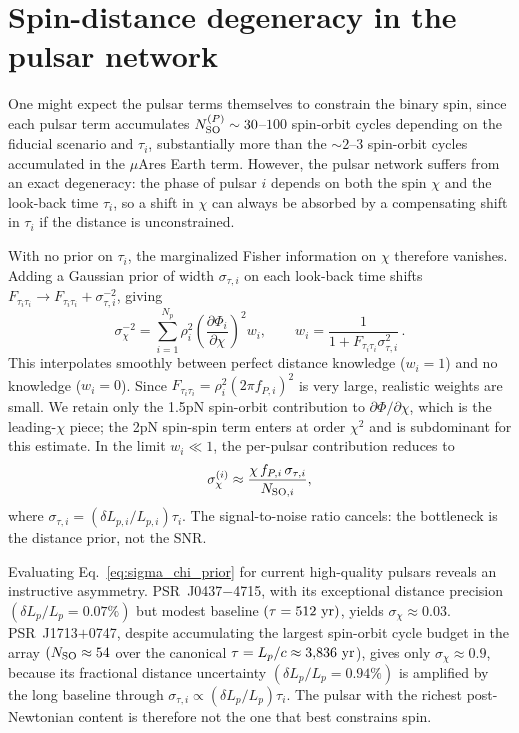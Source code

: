 \documentclass[aps,prx,twocolumn,superscriptaddress,nofootinbib,longbibliography]{revtex4-2}
\begin{document}
\section{Spin-distance degeneracy in the pulsar network}\label{app:spin_degeneracy}

One might expect the pulsar terms themselves to constrain the binary spin, since each pulsar term accumulates $N_{\rm SO}^{(P)}\sim30$--$100$ spin-orbit cycles depending on the fiducial scenario and $\tau_i$, substantially more than the $\sim2$--$3$ spin-orbit cycles accumulated in the $\mu$Ares Earth term. However, the pulsar network suffers from an exact degeneracy: the phase of pulsar $i$ depends on both the spin $\chi$ and the look-back time $\tau_i$, so a shift in $\chi$ can always be absorbed by a compensating shift in $\tau_i$ if the distance is unconstrained.

With no prior on $\tau_i$, the marginalized Fisher information on $\chi$ therefore vanishes. Adding a Gaussian prior of width $\sigma_{\tau,i}$ on each look-back time shifts $F_{\tau_i\tau_i}\rightarrow F_{\tau_i\tau_i}+\sigma_{\tau,i}^{-2}$, giving
\begin{equation}\label{eq:fisher_prior}
  \sigma_\chi^{-2}
  = \sum_{i=1}^{N_p}
  \rho_i^2
  \left(\frac{\partial\Phi_i}{\partial\chi}\right)^2
  w_i,
  \qquad
  w_i = \frac{1}{1 + F_{\tau_i\tau_i}\sigma_{\tau,i}^2}\,.
\end{equation}
This interpolates smoothly between perfect distance knowledge ($w_i=1$) and no knowledge ($w_i=0$). Since $F_{\tau_i\tau_i}=\rho_i^2(2\pi f_{P,i})^2$ is very large, realistic weights are small. We retain only the 1.5pN spin-orbit contribution to $\partial\Phi/\partial\chi$, which is the leading-$\chi$ piece; the 2pN spin-spin term enters at order $\chi^2$ and is subdominant for this estimate. In the limit $w_i\ll1$, the per-pulsar contribution reduces to
\begin{equation}\label{eq:sigma_chi_prior}
  \sigma_\chi^{(i)}
  \approx
  \frac{\chi\,f_{P,i}\,\sigma_{\tau,i}}{N_{{\rm SO},i}},
\end{equation}
where $\sigma_{\tau,i}=(\delta L_{p,i}/L_{p,i})\tau_i$. The signal-to-noise ratio cancels: the bottleneck is the distance prior, not the SNR.

Evaluating Eq.~\eqref{eq:sigma_chi_prior} for current high-quality pulsars reveals an instructive asymmetry. PSR~J0437$-$4715, with its exceptional distance precision $(\delta L_p/L_p=0.07\%)$ but modest baseline $(\tau=512~{\rm yr})$, yields $\sigma_\chi\approx0.03$. PSR~J1713$+$0747, despite accumulating the largest spin-orbit cycle budget in the array $(N_{\rm SO}\approx54$ over the canonical $\tau=L_p/c\approx3{,}836~{\rm yr}$), gives only $\sigma_\chi\approx0.9$, because its fractional distance uncertainty $(\delta L_p/L_p=0.94\%)$ is amplified by the long baseline through $\sigma_{\tau,i}\propto(\delta L_p/L_p)\tau_i$. The pulsar with the richest post-Newtonian content is therefore not the one that best constrains spin.
\end{document}
